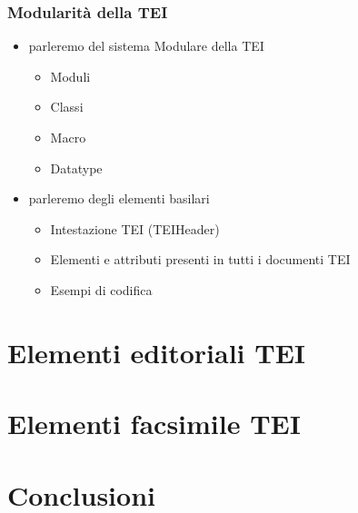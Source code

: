 \documentclass{beamer}
\begin{document}
    \begin{frame}
        \frametitle{Modularità della TEI}
        \addtocounter{nframe}{1}
        
    
        \begin{itemize}
            
            \item<1-> parleremo del sistema Modulare della TEI
                \begin{itemize}
                    \item<1-> Moduli
                    \item<1-> Classi
                    \item<1-> Macro
                    \item<1-> Datatype
                \end{itemize} 
            \item<2-> parleremo degli elementi basilari
                \begin{itemize}
                    \item<2-> Intestazione TEI (TEIHeader)
                    \item<2-> Elementi e attributi presenti in tutti i documenti TEI
                    \item<2-> Esempi di codifica
                \end{itemize} 
        \end{itemize}
        
    \end{frame}
    
    \section{Elementi editoriali TEI}
    
    
    \section{Elementi facsimile TEI}
    
    
    
    
    \section{Conclusioni}
    
    
    
\end{document}
